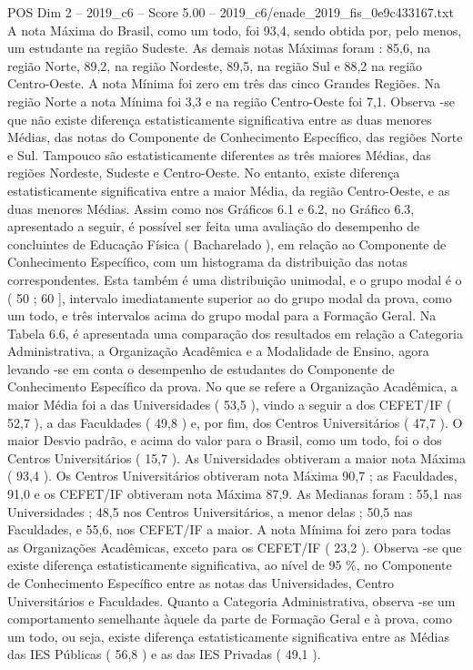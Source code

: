 \begin{textsample}{POS Dim 2 – 2019\_c6 – Score 5.00 – 2019\_c6/enade\_2019\_fis\_0e9c433167.txt}
A nota Máxima do Brasil, como um todo, foi 93,4, sendo obtida por, pelo menos, um estudante na região Sudeste.
As demais notas Máximas foram : 85,6, na região Norte, 89,2, na região Nordeste, 89,5, na região Sul e 88,2 na região Centro-Oeste.
A nota Mínima foi zero em três das cinco Grandes Regiões.
Na região Norte a nota Mínima foi 3,3 e na região Centro-Oeste foi 7,1.
Observa -se que não existe diferença estatisticamente significativa entre as duas menores Médias, das notas do Componente de Conhecimento Específico, das regiões Norte e Sul.
Tampouco são estatisticamente diferentes as três maiores Médias, das regiões Nordeste, Sudeste e Centro-Oeste.
No entanto, existe diferença estatisticamente significativa entre a maior Média, da região Centro-Oeste, e as duas menores Médias.
Assim como nos Gráficos 6.1 e 6.2, no Gráfico 6.3, apresentado a seguir, é possível ser feita uma avaliação do desempenho de concluintes de Educação Física ( Bacharelado ), em relação ao Componente de Conhecimento Específico, com um histograma da distribuição das notas correspondentes.
Esta também é uma distribuição unimodal, e o grupo modal é o ( 50 ; 60 ], intervalo imediatamente superior ao do grupo modal da prova, como um todo, e três intervalos acima do grupo modal para a Formação Geral.
Na Tabela 6.6, é apresentada uma comparação dos resultados em relação a Categoria Administrativa, a Organização Acadêmica e a Modalidade de Ensino, agora levando -se em conta o desempenho de estudantes do Componente de Conhecimento Específico da prova.
No que se refere a Organização Acadêmica, a maior Média foi a das Universidades ( 53,5 ), vindo a seguir a dos CEFET/IF ( 52,7 ), a das Faculdades ( 49,8 ) e, por fim, dos Centros Universitários ( 47,7 ).
O maior Desvio padrão, e acima do valor para o Brasil, como um todo, foi o dos Centros Universitários ( 15,7 ).
As Universidades obtiveram a maior nota Máxima ( 93,4 ).
Os Centros Universitários obtiveram nota Máxima 90,7 ; as Faculdades, 91,0 e os CEFET/IF obtiveram nota Máxima 87,9.
As Medianas foram : 55,1 nas Universidades ; 48,5 nos Centros Universitários, a menor delas ; 50,5 nas Faculdades, e 55,6, nos CEFET/IF a maior.
A nota Mínima foi zero para todas as Organizações Acadêmicas, exceto para os CEFET/IF ( 23,2 ).
Observa -se que existe diferença estatisticamente significativa, ao nível de 95 \%, no Componente de Conhecimento Específico entre as notas das Universidades, Centro Universitários e Faculdades.
Quanto a Categoria Administrativa, observa -se um comportamento semelhante àquele da parte de Formação Geral e à prova, como um todo, ou seja, existe diferença estatisticamente significativa entre as Médias das IES Públicas ( 56,8 ) e as das IES Privadas ( 49,1 ).

\end{textsample}
